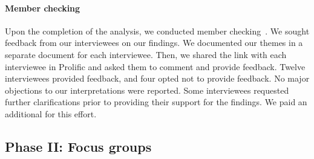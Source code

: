 \paragraph*{Member checking} Upon the completion of the analysis, we conducted member checking~\citep{miles2014qualitative,birt2016member}. We sought feedback from our interviewees on our findings. We documented our themes in a separate document for each interviewee. Then, we shared the link with each interviewee in Prolific and asked them to comment and provide feedback. Twelve interviewees provided feedback, and four opted not to provide feedback. No major objections to our interpretations were reported. Some interviewees requested further clarifications prior to providing their support for the findings. We paid an additional  for this effort.


\subsection{Phase II: Focus groups}\label{sec:phase_2}

